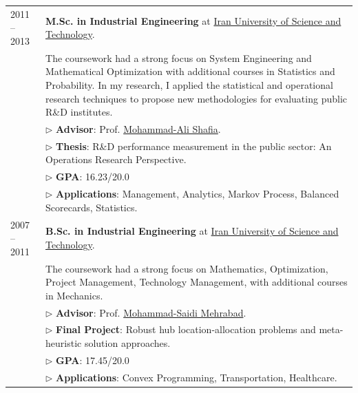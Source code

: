 \documentclass[10PT,letter]{article}
\begin{document}
\begin{tabular}{lp{5.5in}}
	            \textsc{2011 -- 2013} & \textbf{M.Sc. in Industrial Engineering} at \href{http://www.iust.ac.ir/en}{Iran University of Science and Technology}.\\[.5mm]
	            & The coursework had a strong focus on System Engineering and Mathematical Optimization with additional courses in Statistics and Probability. In my research, I applied the statistical and operational research techniques  to propose new methodologies for evaluating  public R\&D institutes.\\[.5mm]
	            & $\triangleright$ {\small\textbf{Advisor}}:  Prof. \href{https://scholar.google.com/citations?hl=en\&user=GV4tnu4AAAAJ\&view_op=list_works\&sortby=pubdate}{Mohammad-Ali Shafia}.\\[1.1mm]
	            & $\triangleright$ {\small\textbf{Thesis}}: R\&D performance measurement in the public sector: An Operations Research Perspective.\\
	            & $\triangleright$ {\small\textbf{GPA}}: 16.23/20.0\\
	            & $\triangleright$ {\small\textbf{Applications}}: Management, Analytics, Markov Process, Balanced Scorecards, Statistics.\\[4mm]
				\textsc{2007 -- 2011} & \textbf{B.Sc. in Industrial Engineering} at \href{http://www.iust.ac.ir/en}{Iran University of Science and Technology}.\\[.5mm]
				& The coursework had a strong focus on Mathematics, Optimization, Project Management, Technology Management,  with additional courses in Mechanics. \\[.5mm]
				& $\triangleright$ {\small\textbf{Advisor}}:  Prof. \href{http://ie.iust.ac.ir/page.php?slct_pg_id=5442\&sid=61\&slc_lang=en}{Mohammad-Saidi Mehrabad}.\\[1.1mm]
				& $\triangleright$ {\small\textbf{Final Project}}: Robust hub location-allocation problems and meta-heuristic solution approaches.\\
				& $\triangleright$ {\small\textbf{GPA}}: 17.45/20.0\\
				& $\triangleright$ {\small\textbf{Applications}}:  Convex Programming, Transportation, Healthcare.
        \end{tabular}
\end{document}
